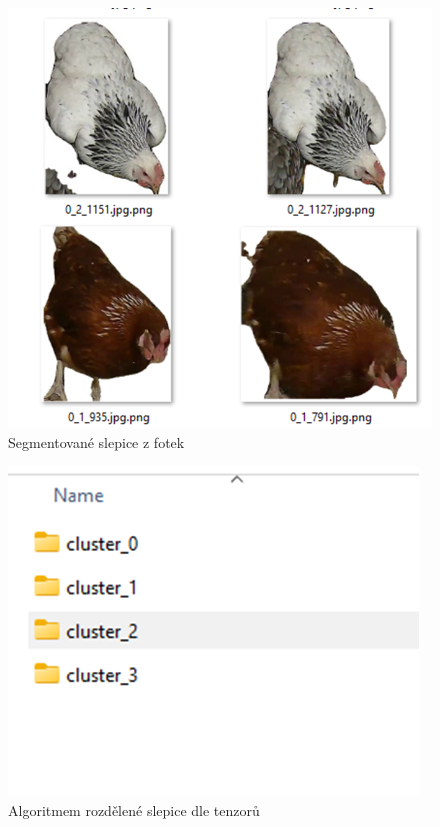 \begin{figure}[h]
    \centering
    \includegraphics[width=\textwidth]{img/segmented_chicks}
    \caption{Segmentované slepice z fotek}
    \label{fig:segmented_chicks2}
\end{figure}

\begin{figure}[h]
    \centering
    \includegraphics[width=\textwidth]{img/chicks_in_clusters}
    \caption{Algoritmem rozdělené slepice dle tenzorů}
    \label{fig:chicks_in_clusters}
\end{figure}
